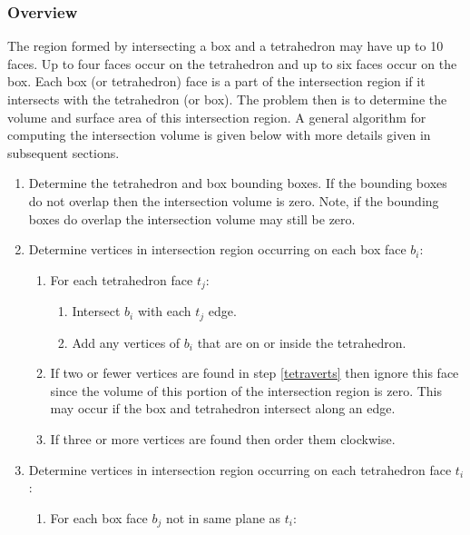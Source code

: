 \documentclass[12pt]{article}
\begin{document}
\subsubsection{Overview}
The region formed by intersecting a box and a tetrahedron may have up to 10 faces.  Up to four faces occur on the tetrahedron and up to six faces occur on the box.  Each box (or tetrahedron) face is a part of the intersection region if it intersects with the tetrahedron (or box).  The problem then is to determine the volume and surface area of this intersection region.  A general algorithm for computing the intersection volume is given below with more details given in subsequent sections.
\begin{enumerate}
\item Determine the tetrahedron and box bounding boxes.  If the bounding boxes do not overlap then the intersection volume is zero.  Note, if the bounding boxes do overlap the intersection volume may still be zero.

\item Determine vertices in intersection region occurring on each box face $b_i$:
\label{boxstep}
\begin{enumerate}
\item For each tetrahedron face $t_j$:
\label{tetraverts}
\begin{enumerate}
\item Intersect $b_i$ with each $t_j$ edge.
\item Add any vertices of $b_i$ that are on or inside the tetrahedron.
\end{enumerate}

\item If two or fewer vertices are found in step \ref{tetraverts} then ignore this face since
the volume of this portion of the intersection region is zero.  This may occur if the box and tetrahedron  intersect along an edge.
\item If three or more vertices are found then order them clockwise.
\end{enumerate}


\item Determine vertices in intersection region occurring on each tetrahedron face $t_i$:
\label{tetrastep}
\begin{enumerate}
\item For each box face $b_j$ not in same plane as $t_i$:
\label{boxverts}


\end{enumerate}
\end{enumerate}
\end{document}
